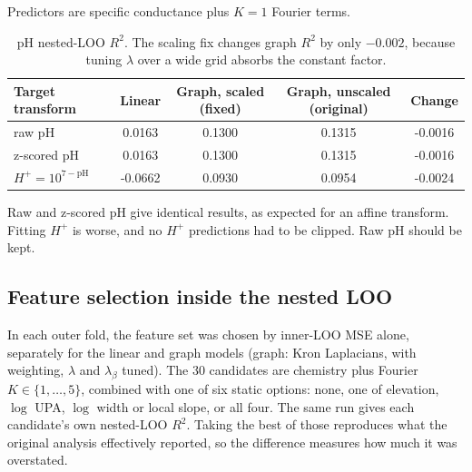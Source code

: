 \documentclass[11pt]{article}
\begin{document}
Predictors are specific conductance plus $K=1$ Fourier terms.

\begin{table}[h]
\centering
\caption{pH nested-LOO $R^2$. The scaling fix changes graph $R^2$ by only $-0.002$, because tuning
$\lambda$ over a wide grid absorbs the constant factor.}
\begin{tabular}{lS S S S}
\toprule
Target transform & {Linear} & {Graph, scaled (fixed)} & {Graph, unscaled (original)} & {Change} \\
\midrule
raw pH          &  0.0163 & 0.1300 & 0.1315 & -0.0016 \\
z-scored pH     &  0.0163 & 0.1300 & 0.1315 & -0.0016 \\
$H^+=10^{7-\mathrm{pH}}$ & -0.0662 & 0.0930 & 0.0954 & -0.0024 \\
\bottomrule
\end{tabular}
\end{table}

Raw and z-scored pH give identical results, as expected for an affine transform. Fitting $H^+$
is worse, and no $H^+$ predictions had to be clipped. Raw pH should be kept.

\subsection{Feature selection inside the nested LOO}\label{sec:nestedsel}

In each outer fold, the feature set was chosen by inner-LOO MSE alone, separately for the linear
and graph models (graph: Kron Laplacians, with weighting, $\lambda$ and $\lambda_\beta$ tuned). The
30 candidates are chemistry plus Fourier $K\in\{1,\dots,5\}$, combined with one of six static
options: none, one of elevation, $\log$ UPA, $\log$ width or local slope, or all four. The same run
gives each candidate's own nested-LOO $R^2$. Taking the best of those reproduces what the original
analysis effectively reported, so the difference measures how much it was overstated.
\end{document}
